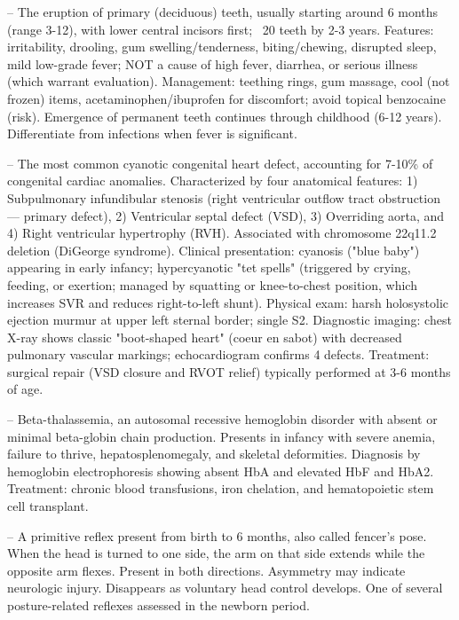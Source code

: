 -- The eruption of primary (deciduous) teeth, usually starting around 6 months (range 3-12), with lower central incisors first; ~20 teeth by 2-3 years. Features: irritability, drooling, gum swelling/tenderness, biting/chewing, disrupted sleep, mild low-grade fever; NOT a cause of high fever, diarrhea, or serious illness (which warrant evaluation). Management: teething rings, gum massage, cool (not frozen) items, acetaminophen/ibuprofen for discomfort; avoid topical benzocaine (risk). Emergence of permanent teeth continues through childhood (6-12 years). Differentiate from infections when fever is significant.

-- The most common cyanotic congenital heart defect, accounting for 7-10\% of congenital cardiac anomalies. Characterized by four anatomical features: 1) Subpulmonary infundibular stenosis (right ventricular outflow tract obstruction — primary defect), 2) Ventricular septal defect (VSD), 3) Overriding aorta, and 4) Right ventricular hypertrophy (RVH). Associated with chromosome 22q11.2 deletion (DiGeorge syndrome). Clinical presentation: cyanosis ("blue baby") appearing in early infancy; hypercyanotic "tet spells" (triggered by crying, feeding, or exertion; managed by squatting or knee-to-chest position, which increases SVR and reduces right-to-left shunt). Physical exam: harsh holosystolic ejection murmur at upper left sternal border; single S2. Diagnostic imaging: chest X-ray shows classic "boot-shaped heart" (coeur en sabot) with decreased pulmonary vascular markings; echocardiogram confirms 4 defects. Treatment: surgical repair (VSD closure and RVOT relief) typically performed at 3-6 months of age.

-- Beta-thalassemia, an autosomal recessive hemoglobin disorder with absent or minimal beta-globin chain production. Presents in infancy with severe anemia, failure to thrive, hepatosplenomegaly, and skeletal deformities. Diagnosis by hemoglobin electrophoresis showing absent HbA and elevated HbF and HbA2. Treatment: chronic blood transfusions, iron chelation, and hematopoietic stem cell transplant.

-- A primitive reflex present from birth to 6 months, also called fencer's pose. When the head is turned to one side, the arm on that side extends while the opposite arm flexes. Present in both directions. Asymmetry may indicate neurologic injury. Disappears as voluntary head control develops. One of several posture-related reflexes assessed in the newborn period.

